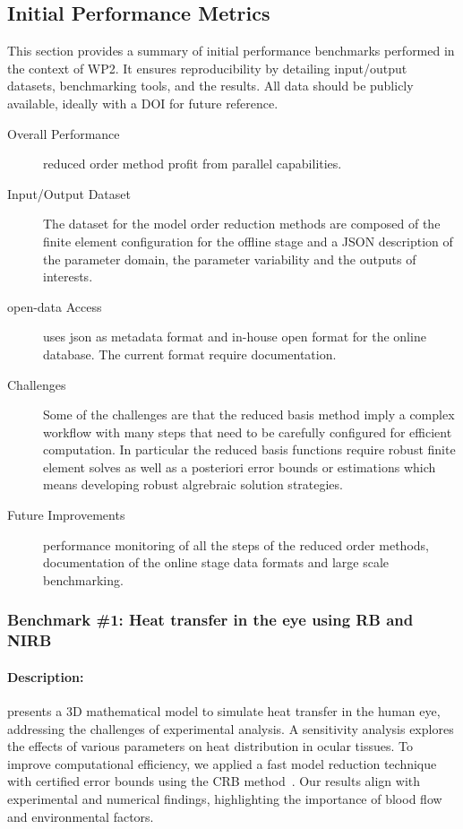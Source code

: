 \subsection{Initial Performance Metrics}
\label{sec:WP2:Feelpp:metrics}

This section provides a summary of initial performance benchmarks performed in the context of WP2. It ensures reproducibility by detailing input/output datasets, benchmarking tools, and the results. All data should be publicly available, ideally with a DOI for future reference.

\begin{description}
    \item[Overall Performance] \Feelpp reduced order method profit from \Feelpp parallel capabilities.
    \item[Input/Output Dataset] The dataset for the \Feelpp model order reduction methods are composed of the finite element configuration for the offline stage and a JSON description of the parameter domain, the parameter variability and the outputs of interests.
    \item[open-data Access] \Feelpp uses json as metadata format and in-house open format for the online database. The current format require documentation.
    \item[Challenges] Some of the challenges are that the reduced basis method imply a complex workflow with many steps that need to be carefully configured for efficient computation. In particular the reduced basis functions require  robust finite element solves as well as a posteriori error bounds or estimations which means developing robust algrebraic solution strategies.
    \item[Future Improvements] performance monitoring of all the steps of the reduced order methods, documentation of the online stage data formats and large scale benchmarking.
\end{description}



\subsubsection{Benchmark \#1: Heat transfer in the eye using \ac{RB} and \ac{NIRB}}

\paragraph{Description:} \cite{saigre_model_2024} presents a 3D mathematical model to simulate heat transfer in the human eye, addressing the challenges of experimental analysis. A sensitivity analysis explores the effects of various parameters on heat distribution in ocular tissues. To improve computational efficiency, we applied a fast model reduction technique with certified error bounds using the \ac{CRB} method~\cite{prudhomme_reliable_2002}. Our results align with experimental and numerical findings, highlighting the importance of blood flow and environmental factors.

